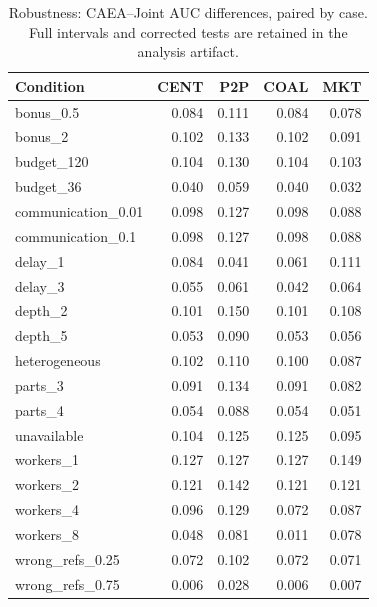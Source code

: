 \begin{table}[t]\centering\small

\caption{Robustness: CAEA--Joint AUC differences, paired by case. Full intervals and corrected tests are retained in the analysis artifact.}

\begin{tabular}{lrrrr}\toprule Condition & CENT & P2P & COAL & MKT\\\midrule

bonus\_0.5 & 0.084 & 0.111 & 0.084 & 0.078\\

bonus\_2 & 0.102 & 0.133 & 0.102 & 0.091\\

budget\_120 & 0.104 & 0.130 & 0.104 & 0.103\\

budget\_36 & 0.040 & 0.059 & 0.040 & 0.032\\

communication\_0.01 & 0.098 & 0.127 & 0.098 & 0.088\\

communication\_0.1 & 0.098 & 0.127 & 0.098 & 0.088\\

delay\_1 & 0.084 & 0.041 & 0.061 & 0.111\\

delay\_3 & 0.055 & 0.061 & 0.042 & 0.064\\

depth\_2 & 0.101 & 0.150 & 0.101 & 0.108\\

depth\_5 & 0.053 & 0.090 & 0.053 & 0.056\\

heterogeneous & 0.102 & 0.110 & 0.100 & 0.087\\

parts\_3 & 0.091 & 0.134 & 0.091 & 0.082\\

parts\_4 & 0.054 & 0.088 & 0.054 & 0.051\\

unavailable & 0.104 & 0.125 & 0.125 & 0.095\\

workers\_1 & 0.127 & 0.127 & 0.127 & 0.149\\

workers\_2 & 0.121 & 0.142 & 0.121 & 0.121\\

workers\_4 & 0.096 & 0.129 & 0.072 & 0.087\\

workers\_8 & 0.048 & 0.081 & 0.011 & 0.078\\

wrong\_refs\_0.25 & 0.072 & 0.102 & 0.072 & 0.071\\

wrong\_refs\_0.75 & 0.006 & 0.028 & 0.006 & 0.007\\

\bottomrule\end{tabular}\end{table}

